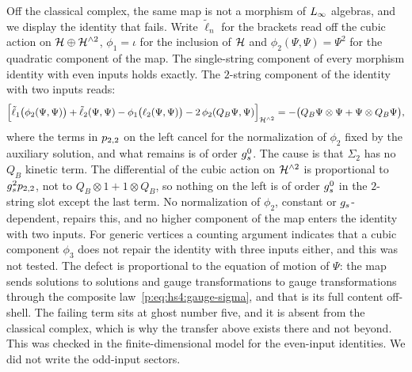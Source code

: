 Off the classical complex, the same map is not a morphism of $L_\infty$ algebras, and we display the identity that fails.
Write $\tilde \ell_n$ for the brackets read off the cubic action on $\mathcal{H} \oplus \mathcal{H}^{\wedge 2}$, $\phi_1 = \iota$ for the inclusion of $\mathcal{H}$ and $\phi_2(\Psi, \Psi) = \Psi^2$ for the quadratic component of the map.
The single-string component of every morphism identity with even inputs holds exactly.
The $2$-string component of the identity with two inputs reads:
\begin{equation}
  \label{p:eq:all:morphism-fails}
  \Big[ \tilde \ell_1 \big( \phi_2(\Psi, \Psi) \big) + \tilde \ell_2(\Psi, \Psi) - \phi_1 \big( \ell_2(\Psi, \Psi) \big) - 2 \, \phi_2(Q_B \Psi, \Psi) \Big]_{\mathcal{H}^{\wedge 2}}
    = - \big( Q_B \Psi \otimes \Psi + \Psi \otimes Q_B \Psi \big),
\end{equation}
where the terms in $p_{2,2}$ on the left cancel for the normalization of $\phi_2$ fixed by the auxiliary solution, and what remains is of order $g_s^0$.
The cause is that $\Sigma_2$ has no $Q_B$ kinetic term.
The differential of the cubic action on $\mathcal{H}^{\wedge 2}$ is proportional to $g_s^2 p_{2,2}$, not to $Q_B \otimes 1 + 1 \otimes Q_B$, so nothing on the left is of order $g_s^0$ in the $2$-string slot except the last term.
No normalization of $\phi_2$, constant or $g_s$-dependent, repairs this, and no higher component of the map enters the identity with two inputs.
For generic vertices a counting argument indicates that a cubic component $\phi_3$ does not repair the identity with three inputs either, and this was not tested.
The defect is proportional to the equation of motion of $\Psi$: the map sends solutions to solutions and gauge transformations to gauge transformations through the composite law~\eqref{p:eq:hs4:gauge-sigma}, and that is its full content off-shell.
The failing term sits at ghost number five, and it is absent from the classical complex, which is why the transfer above exists there and not beyond.
This was checked in the finite-dimensional model for the even-input identities.
  We did not write the odd-input sectors.
